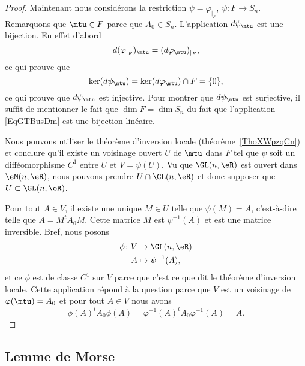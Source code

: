 \begin{proof}
    Maintenant nous considérons la restriction \( \psi=\varphi_{|_F}\), \( \psi\colon F\to S_n\). Remarquons que \( \mtu\in F\) parce que \( A_0\in S_n\). L'application \( d\psi_{\mtu}\) est une bijection. En effet d'abord
    \begin{equation}
        d(\varphi_{|_F})_{\mtu}=(d\varphi_{\mtu})_{|_F},
    \end{equation}
    ce qui prouve que
    \begin{equation}
        \ker(d\psi_{\mtu})=\ker(d\varphi_{\mtu})\cap F=\{ 0 \},
    \end{equation}
    ce qui prouve que \( d\psi_{\mtu}\) est injective. Pour montrer que \( d\psi_{\mtu}\) est surjective, il suffit de mentionner le fait que \( \dim F=\dim S_n\) du fait que l'application \eqref{EqGTBusDm} est une bijection linéaire.

    Nous pouvons utiliser le théorème d'inversion locale (théorème~\ref{ThoXWpzqCn}) et conclure qu'il existe un voisinage ouvert \( U\) de \( \mtu\) dans \( F\) tel que \( \psi\) soit un difféomorphisme \( C^1\) entre \( U\) et \( V=\psi(U)\). Vu que \( \GL(n,\eR)\) est ouvert dans \( \eM(n,\eR)\), nous pouvons prendre \( U\cap \GL(n,\eR)\) et donc supposer que \( U\subset \GL(n,\eR)\).

    Pour tout \( A\in V\), il existe une unique \( M\in U\) telle que \( \psi(M)=A\), c'est-à-dire telle que \( A=M^tA_0M\). Cette matrice \( M\) est \( \psi^{-1}(A)\) et est une matrice inversible. Bref, nous posons
    \begin{equation}
        \begin{aligned}
            \phi\colon V&\to \GL(n,\eR) \\
            A&\mapsto \psi^{-1}(A),
        \end{aligned}
    \end{equation}
    et ce \( \phi\) est de classe \( C^1\) sur \( V\) parce que c'est ce que dit le théorème d'inversion locale. Cette application répond à la question parce que \( V\) est un voisinage de \( \varphi(\mtu)=A_0\) et pour tout \( A\in V\) nous avons
    \begin{equation}
        \phi(A)^tA_0\phi(A)=\varphi^{-1}(A)^tA_0\varphi^{-1}(A)=A.
    \end{equation}
\end{proof}

\subsection{Lemme de Morse}

